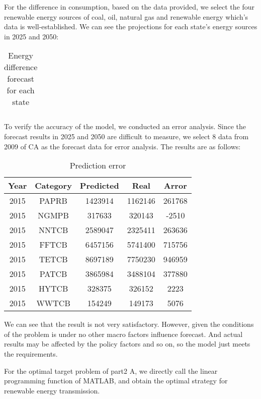 \documentclass{mcmthesis}
\begin{document}
For the difference in consumption, based on the data provided, we select the four renewable energy sources of coal, oil, natural gas and renewable energy which's data is well-established.
We can see the projections for each state's energy sources in 2025 and 2050:
\begin{table}
  \centering
  \caption{Energy difference forecast for each state}
  \label{Energy difference forecast for each state}
  \begin{tabular}{|c|c|c|c|c|c|c|c|c}
    \hline
  \end{tabular}
\end{table}

To verify the accuracy of the model, we conducted an error analysis.
Since the forecast results in 2025 and 2050 are difficult to measure, we select 8 data from 2009 of CA as the forecast data for error analysis. The results are as follows:

\begin{table}[H]
  \centering
  \caption{Prediction error}
  \label{Prediction error }
  \begin{tabular}{|c|c|c|c|c|}
  \hline
  Year & Category & Predicted & Real    & Arror  \\ \hline
  2015 & PAPRB    & 1423914   & 1162146 & 261768 \\ \hline
  2015 & NGMPB    & 317633    & 320143  & -2510  \\ \hline
  2015 & NNTCB    & 2589047   & 2325411 & 263636 \\ \hline
  2015 & FFTCB    & 6457156   & 5741400 & 715756 \\ \hline
  2015 & TETCB    & 8697189   & 7750230 & 946959 \\ \hline
  2015 & PATCB    & 3865984   & 3488104 & 377880 \\ \hline
  2015 & HYTCB    & 328375    & 326152  & 2223   \\ \hline
  2015 & WWTCB    & 154249    & 149173  & 5076   \\ \hline
  \end{tabular}
  \end{table}

 We can see that the result is not very satisfactory. However, given the conditions of the problem is under no other macro factors influence forecast. And actual results may be affected by the policy factors and so on, so the model just meets the requirements.

 For the optimal target problem of part2 A, we directly call the linear programming function of MATLAB, and obtain the optimal strategy for renewable energy transmission.
\end{document}
